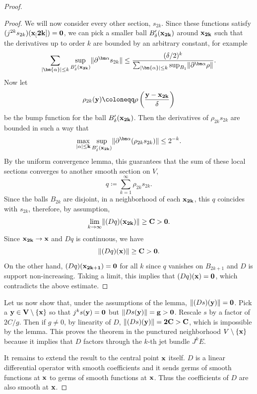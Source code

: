 \begin{proof}
\begin{proof}
        We will now consider every other section, $s_{2k}$. Since these functions satisfy $(j^{2k}s_{2k})(\bf{x}_[2k])=0$, we can pick a smaller ball $B_{\delta}'(\bf{x}_{2k})$ around $\bf{x}_{2k}$ such that the derivatives up to order $k$ are bounded by an arbitrary constant, for example 
        \[\sum_{|\bm{\alpha}|\leq k} \sup_{B_\delta'(\bf{x}_{2k})}\lVert\partial^{\bm\alpha}s_{2k}\rVert\leq \frac{(\delta/2)^k}{\sum_{|\bm{\alpha}|\leq k}\sup_{B_1} \lVert\partial^{\bm\alpha}\rho\rVert}.\]
        Now let 
        \[\rho_{2k}(\bf{y})\coloneqq \rho\left(\frac{\bf{y}-\bf{x}_{2k}}{\delta}\right)\]
        be the bump function for the ball $B_\delta'(\bf{x}_{2k})$. Then the derivatives of $\rho_{2k}s_{2k}$ are bounded in such a way that 
        \[\max_{|\bf{\alpha}|\leq k}\sup_{B_\delta'(\bf{x}_{2k})}\lVert\partial^{\bm\alpha}(\rho_{2k}s_{2k})\rVert\leq 2^{-k}.\]
        By the uniform convergence lemma, this guarantees that the sum of these local sections converges to another smooth section on $V$,
        \[q\coloneqq \sum_{k=1}^\infty \rho_{2k}s_{2k}.\]
        Since the balls $B_{2k}$ are disjoint, in a neighborhood of each $\bf{x}_{2k}$, this $q$ coincides with $s_{2k}$, therefore, by assumption, 
        \[\lim_{k\to\infty}\lVert(Dq)(\bf{x}_{2k})\rVert\geq C>0.\]
        Since $\bf{x}_{2k}\to\bf{x}$ and $Dq$ is continuous, we have 
        \[\lVert (Dq)(\bf{x})\rVert\geq C>0.\]
        On the other hand, $(Dq)(\bf{x}_{2k+1})=0$ for all $k$ since $q$ vanishes on $B_{2k+1}$ and $D$ is support non-increasing. Taking a limit, this implies that $(Dq)(\bf{x})=0$, which contradicts the above estimate.
    \end{proof}
    Let us now show that, under the assumptions of the lemma, $\lVert (Ds)(\bf{y})\rVert=0$. Pick a $\bf{y}\in V\setminus\{\bf{x}\}$ so that $j^ks(\bf{y})=0$ but $\lVert Ds(\bf{y})\rVert=g>0$. Rescale $s$ by a factor of $2C/g$. Then if $g\neq 0$, by linearity of $D$, $\lVert(Ds)(\bf{y})\rVert=2C>C$, which is impossible by the lemma. This proves the theorem in the punctured neighborhood $V\setminus\{\bf{x}\}$ because it implies that $D$ factors through the $k$-th jet bundle $J^kE$.

    It remains to extend the result to the central point $\bf{x}$ itself. $D$ is a linear differential operator with smooth coefficients and it sends germs of smooth functions at $\bf{x}$ to germs of smooth functions at $\bf{x}$. Thus the coefficients of $D$ are also smooth at $\bf{x}$.
\end{proof}

